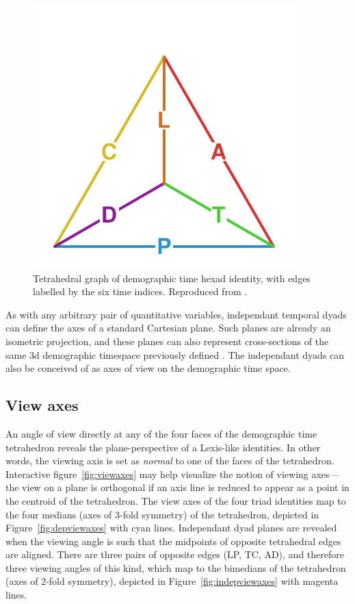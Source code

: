 \begin{figure}[h!]
\centering
\caption{Tetrahedral graph of demographic time hexad identity, with edges
labelled by the six time indices. Reproduced from 
\citet{riffe2017demographictime}.}
\label{fig:tet}
\includegraphics[width=4in]{Figures/TetraHedronEdgesOnly.pdf}%
\end{figure}

As with any arbitrary pair of quantitative variables, independant
temporal dyads can define the axes of a standard Cartesian plane. Such planes
are already an isometric projection, and these planes can also represent
cross-sections of the same 3d demographic timespace previously defined
\citep{riffe2017demographictime}.
The independant dyads can also be conceived of as axes of view on the
demographic time space.

\subsection{View axes}
An angle of view directly at any of the four faces of the demographic
time tetrahedron reveals the plane-perspective of a
Lexis-like identities. In other words, the viewing axis is set as
\emph{normal} to one of the faces of the tetrahedron. Interactive
figure~\ref{fig:viewaxes} may help visualize the notion of viewing axes--- the
view on a plane is orthogonal if an axis line is reduced to appear as a point in
the centroid of the tetrahedron. The view axes of the four triad identities map
to the four medians (axes of 3-fold symmetry) of the tetrahedron, depicted in
Figure~\ref{fig:depviewaxes} with cyan lines.
Independant dyad planes are revealed when the viewing angle is such that the midpoints of opposite tetrahedral edges are aligned. There are three pairs of
opposite edges (LP, TC, AD), and therefore three viewing angles of this kind,
which map to the bimedians of the tetrahedron (axes of 2-fold symmetry),
depicted in Figure~\ref{fig:indepviewaxes} with magenta lines.


